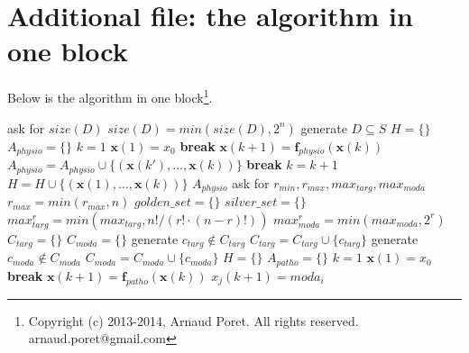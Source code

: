 \documentclass[notitlepage,oneside,onecolumn,a4paper]{article}
\begin{document}
\section*{Additional file: the algorithm in one block}
Below is the algorithm in one block\footnote{Copyright (c) 2013-2014, Arnaud Poret. All rights reserved. arnaud.poret@gmail.com}.
\begin{algorithmic}[1]
\STATE ask for $size(D)$
\STATE $size(D)=min(size(D),2^n)$
\STATE generate $D\subseteq S$
\STATE $H=\lbrace \rbrace$
\STATE $A_{physio}=\lbrace \rbrace$
    \STATE $k=1$
    \STATE $\boldsymbol{x}(1)=x_0$
            \STATE \textbf{break}
        \ENDIF
        \STATE $\boldsymbol{x}(k+1)=\boldsymbol{f}_{physio}(\boldsymbol{x}(k))$
            \STATE $A_{physio}=A_{physio}\cup \lbrace (\boldsymbol{x}(k'),\dots ,\boldsymbol{x}(k))\rbrace$
            \STATE \textbf{break}
        \ENDIF
        \STATE $k=k+1$
    \ENDWHILE
    \STATE $H=H\cup \lbrace (\boldsymbol{x}(1),\dots ,\boldsymbol{x}(k))\rbrace$
\ENDFOR
\RETURN $A_{physio}$
\STATE ask for $r_{min},r_{max},max_{targ},max_{moda}$
\STATE $r_{max}=min(r_{max},n)$
\STATE $golden\_set=\lbrace \rbrace$
\STATE $silver\_set=\lbrace \rbrace$
    \STATE $max_{targ}^{r}=min(max_{targ},n!/(r!\cdot (n-r)!))$
    \STATE $max_{moda}^{r}=min(max_{moda},2^{r})$
    \STATE $C_{targ}=\lbrace \rbrace$
    \STATE $C_{moda}=\lbrace \rbrace$
        \STATE generate $c_{targ}\notin C_{targ}$
        \STATE $C_{targ}=C_{targ}\cup \lbrace c_{targ}\rbrace$
    \ENDWHILE
        \STATE generate $c_{moda}\notin C_{moda}$
        \STATE $C_{moda}=C_{moda}\cup \lbrace c_{moda}\rbrace$
    \ENDWHILE
            \STATE $H=\lbrace \rbrace$
            \STATE $A_{patho}=\lbrace \rbrace$
                \STATE $k=1$
                \STATE $\boldsymbol{x}(1)=x_0$
                        \STATE \textbf{break}
                    \ENDIF
                    \STATE $\boldsymbol{x}(k+1)=\boldsymbol{f}_{patho}(\boldsymbol{x}(k))$
                                \STATE $x_j(k+1)=moda_i$

\end{algorithmic}
\end{document}

